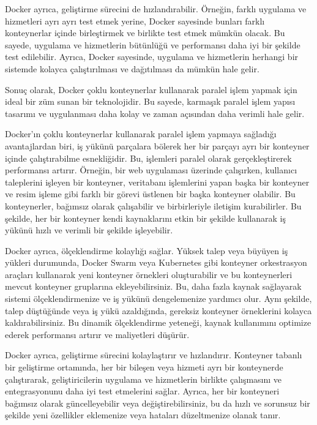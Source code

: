 Docker ayrıca, geliştirme sürecini de hızlandırabilir. Örneğin, farklı uygulama ve hizmetleri ayrı ayrı test etmek yerine, Docker sayesinde bunları farklı konteynerlar içinde birleştirmek ve birlikte test etmek mümkün olacak. Bu sayede, uygulama ve hizmetlerin bütünlüğü ve performansı daha iyi bir şekilde test edilebilir. Ayrıca, Docker sayesinde, uygulama ve hizmetlerin herhangi bir sistemde kolayca çalıştırılması ve dağıtılması da mümkün hale gelir.

Sonuç olarak, Docker çoklu konteynerlar kullanarak paralel işlem yapmak için ideal bir  züm sunan bir teknolojidir. Bu sayede, karmaşık paralel işlem yapısı tasarımı ve uygulanması daha kolay ve zaman açısından daha verimli hale gelir.

Docker'ın çoklu konteynerlar kullanarak paralel işlem yapmaya sağladığı avantajlardan biri, iş yükünü parçalara bölerek her bir parçayı ayrı bir konteyner içinde çalıştırabilme esnekliğidir. Bu, işlemleri paralel olarak gerçekleştirerek performansı artırır. Örneğin, bir web uygulaması üzerinde çalışırken, kullanıcı taleplerini işleyen bir konteyner, veritabanı işlemlerini yapan başka bir konteyner ve resim işleme gibi farklı bir görevi üstlenen bir başka konteyner olabilir. Bu konteynerler, bağımsız olarak çalışabilir ve birbirleriyle iletişim kurabilirler. Bu şekilde, her bir konteyner kendi kaynaklarını etkin bir şekilde kullanarak iş yükünü hızlı ve verimli bir şekilde işleyebilir.

Docker ayrıca, ölçeklendirme kolaylığı sağlar. Yüksek talep veya büyüyen iş yükleri durumunda, Docker Swarm veya Kubernetes gibi konteyner orkestrasyon araçları kullanarak yeni konteyner örnekleri oluşturabilir ve bu konteynerleri mevcut konteyner gruplarına ekleyebilirsiniz. Bu, daha fazla kaynak sağlayarak sistemi ölçeklendirmenize ve iş yükünü dengelemenize yardımcı olur. Aynı şekilde, talep düştüğünde veya iş yükü azaldığında, gereksiz konteyner örneklerini kolayca kaldırabilirsiniz. Bu dinamik ölçeklendirme yeteneği, kaynak kullanımını optimize ederek performansı artırır ve maliyetleri düşürür.

Docker ayrıca, geliştirme sürecini kolaylaştırır ve hızlandırır. Konteyner tabanlı bir geliştirme ortamında, her bir bileşen veya hizmeti ayrı bir konteynerde çalıştırarak, geliştiricilerin uygulama ve hizmetlerin birlikte çalışmasını ve entegrasyonunu daha iyi test etmelerini sağlar. Ayrıca, her bir konteyneri bağımsız olarak güncelleyebilir veya değiştirebilirsiniz, bu da hızlı ve sorunsuz bir şekilde yeni özellikler eklemenize veya hataları düzeltmenize olanak tanır.

